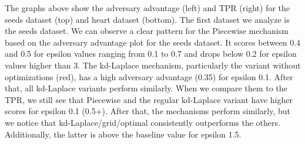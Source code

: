 The graphs above show the adversary advantage (left) and TPR (right) for the seeds dataset (top) and heart dataset (bottom).
The first dataset we analyze is the seeds dataset. We can observe a clear pattern for the Piecewise mechanism based on the adversary advantage plot for the seeds dataset. It scores between 0.4 and 0.5 for epsilon values ranging from 0.1 to 0.7 and drops below 0.2 for epsilon values higher than 3.
The kd-Laplace mechanism, particularly the variant without optimizations (red), has a high adversary advantage (0.35) for epsilon 0.1. After that, all kd-Laplace variants perform similarly. When we compare them to the TPR, we still see that Piecewise and the regular kd-Laplace variant have higher scores for epsilon 0.1 (0.5+). After that, the mechanisms perform similarly, but we notice that kd-Laplace/grid/optimal consistently outperforms the others. Additionally, the latter is above the baseline value for epsilon 1.5.

